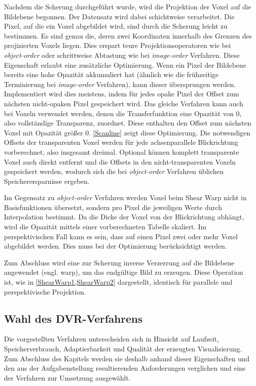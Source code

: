 \documentclass[a4paper,fontsize=12pt,toc=bib,parskip=half,ngerman]{scrartcl}
\begin{document}
Nachdem die Scherung durchgef\"uhrt wurde, wird die Projektion der Voxel auf die Bildebene begonnen. Der Datensatz wird dabei schichtweise verarbeitet. Die Pixel, auf die ein Voxel abgebildet wird, sind durch die Scherung leicht zu bestimmen. Es sind genau die, deren zwei Koordinaten innerhalb des Grenzen des projizierten Voxels liegen. Dies erspart teure Projektionsoperatoren wie bei \textit{object-order} oder schrittweise Abtastung wie bei \textit{image-order} Verfahren. Diese Eigenschaft erlaubt eine zus\"atzliche Optimierung. Wenn ein Pixel der Bildebene bereits eine hohe Opazit\"at akkumuliert hat (\"ahnlich wie die fr\"uhzeitige Terminierung bei \textit{image-order} Verfahren), kann dieser \"ubersprungen werden. Implementiert wird dies meistens, indem f\"ur jedes opake Pixel der Offset zum n\"achsten nicht-opaken Pixel gespeichert wird. Das gleiche Verfahren kann auch bei Voxeln verwendet werden, denen die Transferfunktion eine Opazit\"at von 0, also vollst\"andige Transparenz, zuordnet. Diese enthalten den Offset zum n\"achsten Voxel mit Opazit\"at gr\"o{\ss}er 0. \cref{Scanline} zeigt diese Optimierung. Die notwendigen Offsets der transparenten Voxel werden f\"ur jede achsenparallele Blickrichtung vorberechnet, also insgesamt dreimal. Optional k\"onnen komplett transparente Voxel auch direkt entfernt und die Offsets in den nicht-transparenten Voxeln gespeichert werden, wodurch sich die bei \textit{object-order} Verfahren \"ublichen Speicherersparnisse ergeben. 

Im Gegensatz zu \textit{object-order} Verfahren werden Voxel beim Shear Warp nicht in Basisfunktionen \"ubersetzt, sondern pro Pixel die jeweiligen Werte durch Interpolation bestimmt. Da die Dicke der Voxel von der Blickrichtung abh\"angt, wird die Opazit\"at mittels einer vorberechneten Tabelle skaliert. Im perspektivischen Fall kann es sein, dass auf einen Pixel zwei oder mehr Voxel abgebildet werden. Dies muss bei der Optimierung ber\"ucksichtigt werden.

Zum Abschluss wird eine zur Scherung inverse Verzerrung auf die Bildebene angewendet (engl. \glq warp\grq{}), um das endg\"ultige Bild zu erzeugen. Diese Operation ist, wie in \cref{ShearWarp1,ShearWarp2} dargestellt, identisch f\"ur parallele und perspektivische Projektion.

\subsection{Wahl des DVR-Verfahrens}
Die vorgestellten Verfahren unterscheiden sich in Hinsicht auf Laufzeit, Speicherverbrauch, Adaptierbarkeit und Qualit\"at der erzeugten Visualisierung. Zum Abschluss des Kapitels werden sie deshalb anhand dieser Eigenschaften und den aus der Aufgabenstellung resultierenden Anforderungen verglichen und eins der Verfahren zur Umsetzung ausgew\"ahlt.
\end{document}
